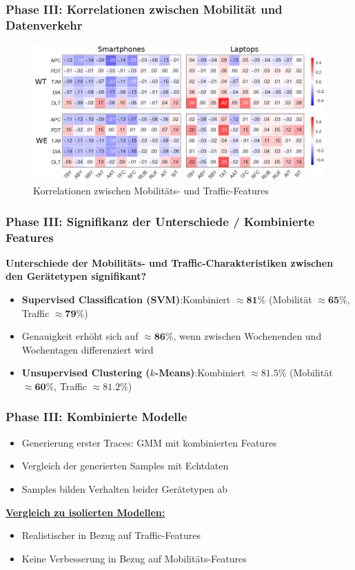 \documentclass{beamer}
\begin{document}
\begin{frame}
  \frametitle{Phase III: Korrelationen zwischen Mobilität und Datenverkehr}
  \begin{figure}
    \centering
    \includegraphics[width=\textwidth]{images/correlations.png}
    \caption*{Korrelationen zwischen Mobilitäts- und Traffic-Features \cite{Alipour2018}}
  \end{figure}
\end{frame}

\begin{frame}
  \frametitle{Phase III: Signifikanz der Unterschiede / Kombinierte Features}
  \textbf{Unterschiede der Mobilitäts- und Traffic-Charakteristiken zwischen den Gerätetypen signifikant?}\newline
  \begin{itemize}
    \item \textbf{Supervised Classification (SVM)}:\newline Kombiniert $\approx \boldsymbol{81\%}$ (Mobilität $\approx \boldsymbol{65 \%}$, Traffic $\approx \boldsymbol{79 \%}$)
    \item Genauigkeit erhöht sich auf $\approx \boldsymbol{86\%}$, wenn zwischen Wochenenden und Wochentagen differenziert wird\newline
    \item \textbf{Unsupervised Clustering ($k$-Means)}:\newline Kombiniert $\approx\boldsymbol{81.5 \%}$ (Mobilität $\approx \boldsymbol{60 \%}$, Traffic $\approx \boldsymbol{81.2 \%}$)
  \end{itemize}
\end{frame}

\begin{frame}
  \frametitle{Phase III: Kombinierte Modelle}
  \begin{itemize}
    \item Generierung erster Traces: \textsc{GMM} mit kombinierten Features
    \item Vergleich der generierten Samples mit Echtdaten
    \item Samples bilden Verhalten beider Gerätetypen ab
  \end{itemize}
  \vspace{15px}
  \textbf{\underline{Vergleich zu isolierten Modellen:}}
  \begin{itemize}
    \item Realistischer in Bezug auf Traffic-Features
    \item Keine Verbesserung in Bezug auf Mobilitäts-Features
  \end{itemize}
\end{frame}
\end{document}
